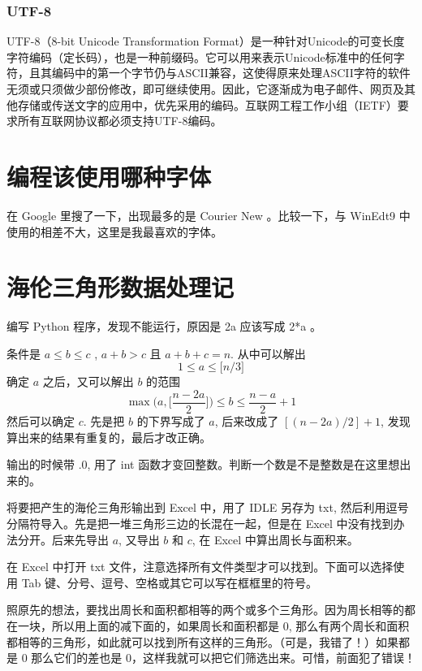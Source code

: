 \documentclass{article}
\begin{document}
    \subsubsection{UTF-8}
        UTF-8（8-bit Unicode Transformation Format）是一种针对Unicode的可变长度字符编码（定长码），也是一种前缀码。它可以用来表示Unicode标准中的任何字符，且其编码中的第一个字节仍与ASCII兼容，这使得原来处理ASCII字符的软件无须或只须做少部份修改，即可继续使用。因此，它逐渐成为电子邮件、网页及其他存储或传送文字的应用中，优先采用的编码。互联网工程工作小组（IETF）要求所有互联网协议都必须支持UTF-8编码。

\section{编程该使用哪种字体}
    在 Google 里搜了一下，出现最多的是 Courier New 。比较一下，与 WinEdt9 中使用的相差不大，这里是我最喜欢的字体。
\section{海伦三角形数据处理记}
    编写 Python 程序，发现不能运行，原因是 2a 应该写成 2*a 。

    条件是 $a\le b\le c$ , $a+b>c$ 且 $a+b+c=n$. 从中可以解出
    $$1\le a\le \big[n/3\big]$$
    确定 $a$ 之后，又可以解出 $b$ 的范围
    $$\max\bigg(a, \bigg[\dfrac{n-2a}{2}\bigg]\bigg)\le b\le\frac{n-a}{2}+1$$
    然后可以确定 $c$. 先是把 $b$ 的下界写成了 $a$, 后来改成了 $[(n-2a)/2]+1$, 发现算出来的结果有重复的，最后才改正确。

    输出的时候带 .0, 用了 int 函数才变回整数。判断一个数是不是整数是在这里想出来的。

    将要把产生的海伦三角形输出到 Excel 中，用了 IDLE 另存为 txt, 然后利用逗号分隔符导入。先是把一堆三角形三边的长混在一起，但是在 Excel 中没有找到办法分开。后来先导出 $a$, 又导出 $b$ 和 $c$, 在 Excel 中算出周长与面积来。

    在 Excel 中打开 txt 文件，注意选择所有文件类型才可以找到。下面可以选择使用 Tab 键、分号、逗号、空格或其它可以写在框框里的符号。

    照原先的想法，要找出周长和面积都相等的两个或多个三角形。因为周长相等的都在一块，所以用上面的减下面的，如果周长和面积都是 0, 那么有两个周长和面积都相等的三角形，如此就可以找到所有这样的三角形。（可是，我错了！）如果都是 0 那么它们的差也是 0，这样我就可以把它们筛选出来。可惜，前面犯了错误！
\end{document}
